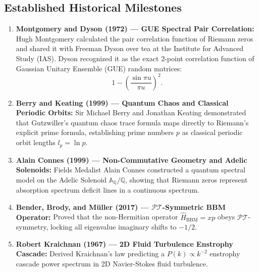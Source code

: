 \documentclass[11pt,a4paper]{article}
\begin{document}
\subsection{Established Historical Milestones}
\begin{enumerate}
    \item \textbf{Montgomery and Dyson (1972) --- GUE Spectral Pair Correlation:} Hugh Montgomery calculated the pair correlation function of Riemann zeros and shared it with Freeman Dyson over tea at the Institute for Advanced Study (IAS). Dyson recognized it as the exact 2-point correlation function of Gaussian Unitary Ensemble (GUE) random matrices:
    \begin{equation}
    1 - \left( \frac{\sin \pi u}{\pi u} \right)^2.
    \end{equation}
    \item \textbf{Berry and Keating (1999) --- Quantum Chaos and Classical Periodic Orbits:} Sir Michael Berry and Jonathan Keating demonstrated that Gutzwiller's quantum chaos trace formula maps directly to Riemann's explicit prime formula, establishing prime numbers $p$ as classical periodic orbit lengths $l_p = \ln p$.
    \item \textbf{Alain Connes (1999) --- Non-Commutative Geometry and Adelic Solenoids:} Fields Medalist Alain Connes constructed a quantum spectral model on the Adelic Solenoid $\mathbb{A}_{\mathbb{Q}} / \mathbb{Q}$, showing that Riemann zeros represent absorption spectrum deficit lines in a continuous spectrum.
    \item \textbf{Bender, Brody, and M\"uller (2017) --- \texorpdfstring{$\mathcal{PT}$}{PT}-Symmetric BBM Operator:} Proved that the non-Hermitian operator $\hat{H}_{\text{BBM}} = x p$ obeys $\mathcal{PT}$-symmetry, locking all eigenvalue imaginary shifts to $-1/2$.
    \item \textbf{Robert Kraichnan (1967) --- 2D Fluid Turbulence Enstrophy Cascade:} Derived Kraichnan's law predicting a $P(k) \propto k^{-2}$ enstrophy cascade power spectrum in 2D Navier-Stokes fluid turbulence.
\end{enumerate}
\end{document}
